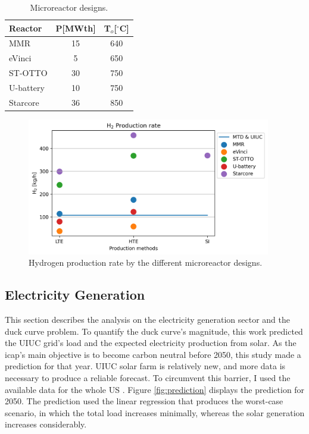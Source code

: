 	\begin{table}[htbp!]
		\centering
	    \caption{Microreactor designs.}
		\begin{tabular}{lcc}
		\toprule
		Reactor                                      & P[MWth] & T$_o$[$^\circ$C] \\
		\midrule
		MMR \cite{usnc_mmr_2019}  		             & 15      & 640              \\
		eVinci \cite{hernandez_micro_2019}           & 5       & 650              \\
		ST-OTTO \cite{harlan_x-energy_2018}          & 30      & 750              \\
		U-battery \cite{ding_design_2011}            & 10      & 750              \\
		Starcore \cite{star_core_nuclear_star_2015}  & 36      & 850              \\
		\toprule
        \end{tabular}
        \label{tab:hydro-micro}
	\end{table}

	\begin{figure}[htbp!]
	    \centering
		\includegraphics[height=6.0cm]{figures-hydro/reactors-by-hour1}
		\hfill
		\caption{Hydrogen production rate by the different microreactor designs.}
		\label{fig:hydro-micro}
	\end{figure}

\subsection{Electricity Generation}
\label{sec:results-electric}

This section describes the analysis on the electricity generation sector and the duck curve problem.
To quantify the duck curve's magnitude, this work predicted the \gls{UIUC} grid's load and the expected electricity production from solar.
As the \gls{icap}'s main objective is to become carbon neutral before 2050, this study made a prediction for that year.
\gls{UIUC} solar farm is relatively new, and more data is necessary to produce a reliable forecast.
To circumvent this barrier, I used the available data for the whole \gls{US} \cite{us_energy_information_administration_electric_2020}.
Figure \ref{fig:prediction} displays the prediction for 2050.
The prediction used the linear regression that produces the worst-case scenario, in which the total load increases minimally, whereas the solar generation increases considerably.

